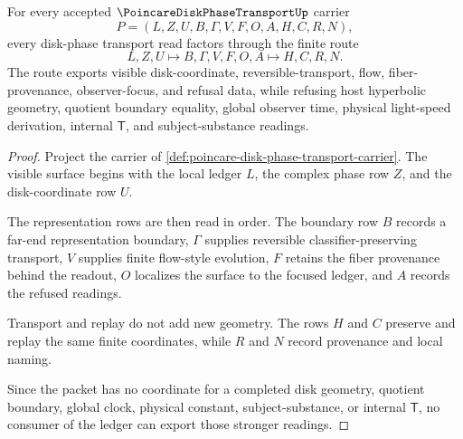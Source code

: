 \begin{theorem}
\label{thm:poincare-disk-phase-transport-ledger}
For every accepted $\PoincareDiskPhaseTransportUp$ carrier
$$
P=(L,Z,U,B,\Gamma,V,F,O,A,H,C,R,N),
$$
every disk-phase transport read factors through the finite route
$$
L,Z,U \longmapsto B,\Gamma,V,F,O,A \longmapsto H,C,R,N.
$$
The route exports visible disk-coordinate, reversible-transport, flow, fiber-provenance, observer-focus, and refusal data, while refusing host hyperbolic geometry, quotient boundary equality, global observer time, physical light-speed derivation, internal $\mathsf{T}$, and subject-substance readings.
\end{theorem}
\begin{proof}
Project the carrier of \autoref{def:poincare-disk-phase-transport-carrier}. The visible surface begins with the local ledger $L$, the complex phase row $Z$, and the disk-coordinate row $U$.

The representation rows are then read in order. The boundary row $B$ records a far-end representation boundary, $\Gamma$ supplies reversible classifier-preserving transport, $V$ supplies finite flow-style evolution, $F$ retains the fiber provenance behind the readout, $O$ localizes the surface to the focused ledger, and $A$ records the refused readings.

Transport and replay do not add new geometry. The rows $H$ and $C$ preserve and replay the same finite coordinates, while $R$ and $N$ record provenance and local naming.

Since the packet has no coordinate for a completed disk geometry, quotient boundary, global clock, physical constant, subject-substance, or internal $\mathsf{T}$, no consumer of the ledger can export those stronger readings.
\end{proof}


